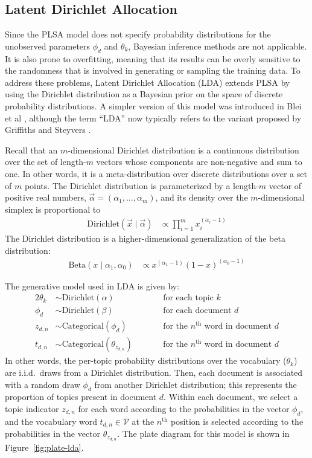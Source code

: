 \documentclass{article}
\newcommand{\nth}{^{\text{th}}}
\begin{document}
\subsection{Latent Dirichlet Allocation}

Since the PLSA model does not specify probability distributions for the unobserved parameters $\phi_d$ and $\theta_k$, Bayesian inference methods are not applicable.
It is also prone to overfitting, meaning that its results can be overly sensitive to the randomness that is involved in generating or sampling the training data.
To address these problems, Latent Dirichlet Allocation (LDA) extends PLSA by using the Dirichlet distribution as a Bayesian prior on the space of discrete probability distributions.
A simpler version of this model was introduced in Blei et al \cite{blei2003lda}, although the term ``LDA'' now typically refers to the variant proposed by Griffiths and Steyvers \cite{griffiths2004lda}.

Recall that an $m$-dimensional Dirichlet distribution is a continuous distribution over the set of length-$m$ vectors whose components are non-negative and sum to one.
In other words, it is a meta-distribution over discrete distributions over a set of $m$ points.
The Dirichlet distribution is parameterized by a length-$m$ vector of positive real numbers, $\vec \alpha = (\alpha_1, \ldots, \alpha_m)$, and its density over the $m$-dimensional simplex is proportional to
\begin{align}
\text{Dirichlet}(\vec x \mid \vec \alpha) &\propto \prod_{i=1}^m x_i^{(\alpha_i-1)}
\end{align}
The Dirichlet distribution is a higher-dimensional generalization of the beta distribution:
\begin{align}
\text{Beta}(x \mid \alpha_1, \alpha_0) &\propto x^{(\alpha_1-1)} (1-x)^{(\alpha_0-1)}
\end{align}

The generative model used in LDA is given by:
\begin{alignat}{2}
\theta_k &\sim \text{Dirichlet}(\alpha) &\qquad&\text{for each topic $k$} \\
\phi_d &\sim \text{Dirichlet}(\beta) &\qquad&\text{for each document $d$} \\
z_{d,n} &\sim \text{Categorical}(\phi_d) &\qquad&\text{for the $n\nth$ word in document $d$} \\
t_{d,n} &\sim \text{Categorical}(\theta_{z_{d,n}}) &\qquad&\text{for the $n\nth$ word in document $d$}
\end{alignat}
In other words, the per-topic probability distributions over the vocabulary ($\theta_k$) are i.i.d.\ draws from a Dirichlet distribution.
Then, each document is associated with a random draw $\phi_d$ from another Dirichlet distribution; this represents the proportion of topics present in document $d$.
Within each document, we select a topic indicator $z_{d,n}$ for each word according to the probabilities in the vector $\phi_d$, and the vocabulary word $t_{d,n} \in \mathcal V$ at the $n\nth$ position is selected according to the probabilities in the vector $\theta_{z_{d,n}}$.
The plate diagram for this model is shown in Figure~\ref{fig:plate-lda}.
\end{document}

